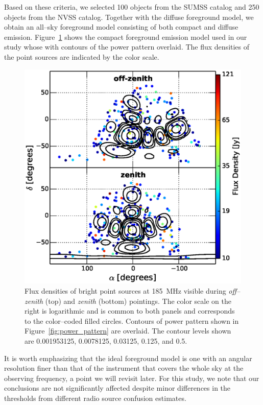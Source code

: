 \documentclass[preprint2,iop,numberedappendix]{emulateapj}
\begin{document}
Based on these criteria, we selected 100 objects from the SUMSS catalog and 250 objects from the NVSS catalog. Together with the diffuse foreground model, we obtain an all--sky foreground model consisting of both compact and diffuse emission. Figure~\ref{fig:CSM} shows the compact foreground emission model used in our study whose with contours of the power pattern overlaid. The flux densities of the point sources are indicated by the color scale. 

\begin{figure}[htb]
\centering
\includegraphics[width=\linewidth]{fig7.eps}
\caption{Flux densities of bright point sources at 185~MHz visible during {\it off--zenith} (top) and {\it zenith} (bottom) pointings. The color scale on the right is logarithmic and is common to both panels and corresponds to the color--coded filled circles. Contours of power pattern shown in Figure~\ref{fig:power_pattern} are overlaid. The contour levels shown are 0.001953125, 0.0078125, 0.03125, 0.125, and 0.5. \label{fig:CSM}}
\end{figure}

It is worth emphasizing that the ideal foreground model is one with an angular resolution finer than that of the instrument that covers the whole sky at the observing frequency, a point we will revisit later. For this study, we note that our conclusions are not significantly affected despite minor differences in the thresholds from different radio source confusion estimates.
\end{document}
